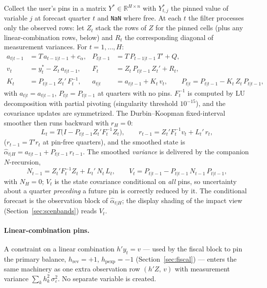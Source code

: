 \documentclass[11pt]{article}
\newcommand{\R}{\mathbb{R}}
\theoremstyle{plain}
\theoremstyle{remark}
\begin{document}
Collect the user's pins in a matrix $Y^{\ast} \in \R^{H\times n}$ with
$Y^{\ast}_{t,j}$ the pinned value of variable $j$ at forecast quarter
$t$ and \texttt{NaN} where free. At each $t$ the filter processes only
the observed rows: let $Z_t$ stack the rows of $Z$ for the pinned cells
(plus any linear-combination rows, below) and $R_t$ the corresponding
diagonal of measurement variances. For $t = 1,\dots,H$:
\begin{align}
  a_{t|t-1} &= T\, a_{t-1|t-1} + c_\alpha,
  &P_{t|t-1} &= T\, P_{t-1|t-1}\, T' + Q, \label{eq:kfpred}\\
  v_t &= y^{\ast}_t - Z_t\, a_{t|t-1},
  &F_t &= Z_t\, P_{t|t-1}\, Z_t' + R_t, \label{eq:kfinnov}\\
  K_t &= P_{t|t-1}\, Z_t'\, F_t^{-1},
  &a_{t|t} &= a_{t|t-1} + K_t\, v_t,
  \qquad
  P_{t|t} = P_{t|t-1} - K_t\, Z_t\, P_{t|t-1}, \label{eq:kfupd}
\end{align}
with $a_{t|t}=a_{t|t-1}$, $P_{t|t}=P_{t|t-1}$ at quarters with no pins.
$F_t^{-1}$ is computed by LU decomposition with partial pivoting
(singularity threshold $10^{-15}$), and the covariance updates are
symmetrized. The Durbin--Koopman fixed-interval smoother then runs
backward with $r_H = 0$:
\begin{equation}\label{eq:dk}
  L_t = T\bigl(I - P_{t|t-1} Z_t' F_t^{-1} Z_t\bigr), \qquad
  r_{t-1} = Z_t' F_t^{-1} v_t + L_t'\, r_t,
\end{equation}
($r_{t-1} = T' r_t$ at pin-free quarters), and the smoothed state is
$\hat\alpha_{t|H} = a_{t|t-1} + P_{t|t-1}\, r_{t-1}$. The smoothed
\emph{variance} is delivered by the companion $N$-recursion,
\begin{equation}\label{eq:Nrec}
  N_{t-1} = Z_t' F_t^{-1} Z_t + L_t'\, N_t\, L_t, \qquad
  V_t = P_{t|t-1} - P_{t|t-1}\, N_{t-1}\, P_{t|t-1},
\end{equation}
with $N_H = 0$; $V_t$ is the state covariance conditional on \emph{all}
pins, so uncertainty about a quarter \emph{preceding} a future pin is
correctly reduced by it. The conditional forecast is the observation
block of $\hat\alpha_{t|H}$; the display shading of the impact view
(Section~\ref{sec:scenbands}) reads $V_t$.

\paragraph{Linear-combination pins.} A constraint on a linear
combination $h'y_t = v$ --- used by the fiscal block to pin the primary
balance, $h_{\text{rev}} = +1$, $h_{\text{pexp}} = -1$
(Section~\ref{sec:fiscal}) --- enters the same machinery as one extra
observation row $(h'Z,\, v)$ with measurement variance
$\sum_k h_k^2\,\sigma^2_\varepsilon$. No separate variable is created.
\end{document}
